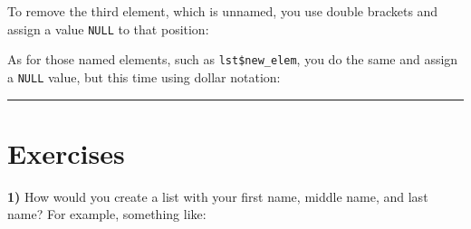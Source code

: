 \documentclass[
]{book}
\newenvironment{Shaded}{\begin{snugshade}}{\end{snugshade}}
\newcommand{\ConstantTok}[1]{\textcolor[rgb]{0.00,0.00,0.00}{#1}}
\newcommand{\DecValTok}[1]{\textcolor[rgb]{0.00,0.00,0.81}{#1}}
\newcommand{\ErrorTok}[1]{\textcolor[rgb]{0.64,0.00,0.00}{\textbf{#1}}}
\newcommand{\NormalTok}[1]{#1}
\newcommand{\OtherTok}[1]{\textcolor[rgb]{0.56,0.35,0.01}{#1}}
\newcommand{\SpecialCharTok}[1]{\textcolor[rgb]{0.00,0.00,0.00}{#1}}
\newcommand{\StringTok}[1]{\textcolor[rgb]{0.31,0.60,0.02}{#1}}
\begin{document}
To remove the third element, which is unnamed, you use double brackets and
assign a value \texttt{NULL} to that position:

\begin{Shaded}
\end{Shaded}

As for those named elements, such as \texttt{lst\$new\_elem}, you do the same and assign
a \texttt{NULL} value, but this time using dollar notation:

\begin{Shaded}
\end{Shaded}

\begin{center}\rule{0.5\linewidth}{0.5pt}\end{center}

\hypertarget{exercises-5}{%
\section{Exercises}\label{exercises-5}}

\textbf{1)} How would you create a list with your first name, middle name, and last
name? For example, something like:
\end{document}
